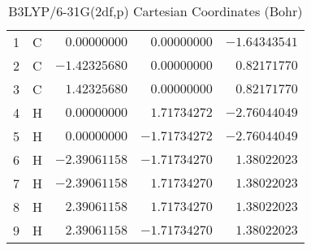 \documentclass[10pt,oneside]{article}
\begin{document}
\begin{table}[h]
\centering
\caption{B3LYP/6-31G(2df,p) Cartesian Coordinates (Bohr)}
\begin{tabular}{llrrr}
\toprule
1  & C  & $ 0.00000000$ & $ 0.00000000$ & $-1.64343541$ \\
2  & C  & $-1.42325680$ & $ 0.00000000$ & $ 0.82171770$ \\
3  & C  & $ 1.42325680$ & $ 0.00000000$ & $ 0.82171770$ \\
4  & H  & $ 0.00000000$ & $ 1.71734272$ & $-2.76044049$ \\
5  & H  & $ 0.00000000$ & $-1.71734272$ & $-2.76044049$ \\
6  & H  & $-2.39061158$ & $-1.71734270$ & $ 1.38022023$ \\
7  & H  & $-2.39061158$ & $ 1.71734270$ & $ 1.38022023$ \\
8  & H  & $ 2.39061158$ & $ 1.71734270$ & $ 1.38022023$ \\
9  & H  & $ 2.39061158$ & $-1.71734270$ & $ 1.38022023$ \\
\bottomrule
\end{tabular}
\end{table}
\end{document}
